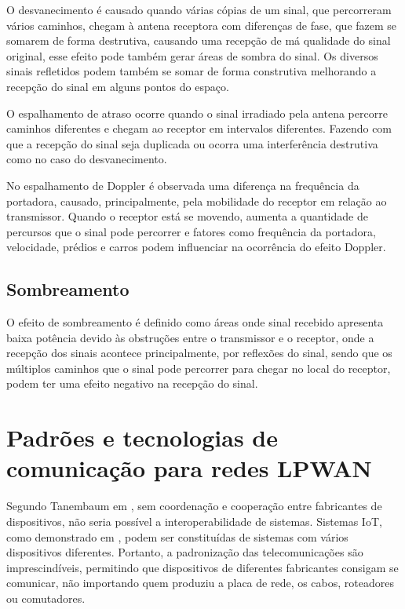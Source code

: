 O desvanecimento é causado quando várias cópias de um sinal, que percorreram vários caminhos, chegam à antena receptora com diferenças de fase, que fazem se somarem de forma destrutiva, causando uma recepção de má qualidade do sinal original, esse efeito pode também gerar áreas de sombra do sinal. Os diversos sinais refletidos podem também se somar de forma construtiva melhorando a recepção do sinal em alguns pontos do espaço.

O espalhamento de atraso ocorre quando o sinal irradiado pela antena percorre caminhos diferentes e chegam ao receptor em intervalos diferentes. Fazendo com que a recepção do sinal seja duplicada ou ocorra uma interferência destrutiva como no caso do desvanecimento.

No espalhamento de Doppler é observada uma diferença na frequência da portadora, causado, principalmente, pela mobilidade do receptor em relação ao transmissor. Quando o receptor está se movendo, aumenta a quantidade de percursos que o sinal pode percorrer e fatores como frequência da portadora, velocidade, prédios e carros podem influenciar na ocorrência do efeito Doppler.


\subsection{Sombreamento}
O efeito de sombreamento é definido como áreas onde sinal recebido apresenta baixa potência devido às obstruções entre o transmissor e o receptor, onde a recepção dos sinais acontece principalmente, por reflexões do sinal, sendo que os múltiplos caminhos que o sinal pode percorrer para chegar no local do receptor, podem ter uma efeito negativo na recepção do sinal.


\section{Padrões e tecnologias de comunicação para redes LPWAN}
\label{padrõesSF}
Segundo Tanembaum em \cite{tanembaum2011}, sem coordenação e cooperação entre fabricantes de dispositivos, não seria possível a interoperabilidade de sistemas. Sistemas IoT, como demonstrado em \cite{sotres2017practical}, podem ser constituídas de sistemas com vários dispositivos diferentes. Portanto, a padronização das telecomunicações são imprescindíveis, permitindo que dispositivos de diferentes fabricantes consigam se comunicar, não importando quem produziu a placa de rede, os cabos, roteadores ou comutadores.

